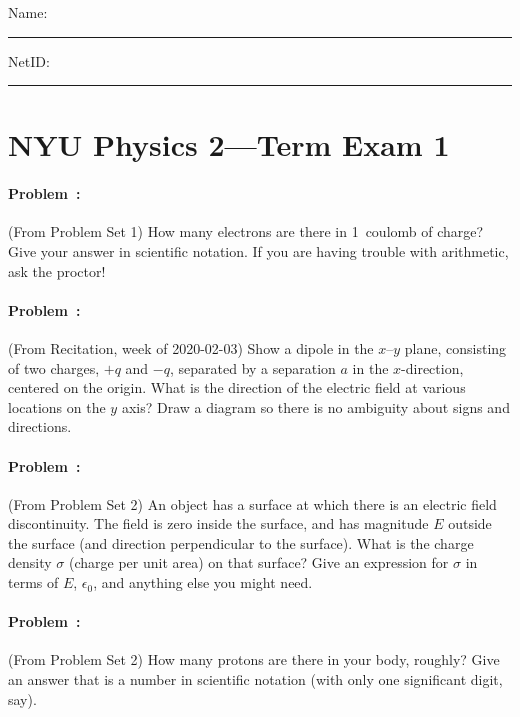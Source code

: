 \documentclass[12pt]{article}
\begin{document}
\raggedright

\noindent
Name: \rule[-1ex]{0.55\textwidth}{0.1pt}
NetID: \rule[-1ex]{0.2\textwidth}{0.1pt}

\section*{NYU Physics 2---Term Exam 1}

\paragraph{Problem~\theproblem:}%
(From Problem Set 1)
How many electrons are there in 1~coulomb of charge?
Give your answer in scientific notation.
If you are having trouble with arithmetic, ask the proctor!

\vfill
\paragraph{Problem~\theproblem:}%
(From Recitation, week of 2020-02-03)
Show a dipole in the $x$--$y$ plane, consisting of two charges, $+q$ and $-q$, separated by a
separation $a$ in the $x$-direction, centered on the origin.
What is the direction of the electric field at various locations on the $y$ axis?
Draw a diagram so there is no ambiguity about signs and directions.

\vfill
\paragraph{Problem~\theproblem:}%
(From Problem Set 2)
An object has a surface at which there is an electric field discontinuity.
The field is zero inside the surface, and has magnitude $E$ outside the surface
(and direction perpendicular to the surface).
What is the charge density $\sigma$ (charge per unit area) on that surface?
Give an expression for $\sigma$ in terms of $E$, $\epsilon_0$, and anything else you might need.

\vfill
\paragraph{Problem~\theproblem:}%
(From Problem Set 2)
How many protons are there in your body, roughly?
Give an answer that is a number in scientific notation (with only one significant digit, say).

\vfill ~
\clearpage
\end{document}
